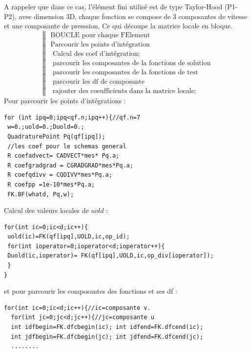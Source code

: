 \documentclass{book}
\begin{document}
A rappeler que dans ce cas, l'élément fini utilisé est de type Taylor-Hood (P1-P2), avec dimension 3D, chaque fonction se compose de 3 composantes de vitesse et une composante de presssion. Ce qui découpe la matrice locale en bloque.  
\[
\left\|
\begin{array}{l}
\text{BOUCLE pour chaque FElement} \\
\text{Parcourir les points d'intégration} \\
\text{ Calcul des coef d'intégration;} \\
\text{ parcourir les composantes de la fonctions de solution}\\
\text{   parcourir les composantes de la fonctions de test}\\
\text{      parcourir les df de composante}\\
\text{          rajouter des coeufficients dans la matrice locale;} 
\end{array}
\right.
\]
Pour parcourir les points d'intégrations :
\begin{lstlisting}
for (int ipq=0;ipq<qf.n;ipq++){//qf.n=7
 w=0.;uold=0.;Duold=0.;
 QuadraturePoint Pq(qf[ipq]);
 //les coef pour le schemas general
 R coefadvect= CADVECT*mes* Pq.a;
 R coefgradgrad = CGRADGRAD*mes*Pq.a;
 R coefqdivv = CQDIVV*mes*Pq.a;
 R coefpp =1e-10*mes*Pq.a;
 FK.BF(whatd, Pq,w); 
\end{lstlisting}
Calcul des valeurs locales de $uold$ :
\begin{lstlisting}
for(int ic=0;ic<d;ic++){ 
 uold(ic)=FK(qf[ipq],UOLD,ic,op_id);
 for(int ioperator=0;ioperator<d;ioperator++){
 Duold(ic,ioperator)= FK(qf[ipq],UOLD,ic,op_div[ioperator]);
 }	
}	  
\end{lstlisting}
et pour parcourir les composantes des fonctions et ses df :
\begin{lstlisting}
for(int ic=0;ic<d;ic++){//ic=composante v.
  for(int jc=0;jc<d;jc++){//jc=composante u
  int idfbegin=FK.dfcbegin(ic); int idfend=FK.dfcend(ic); 
  int jdfbegin=FK.dfcbegin(jc); int jdfend=FK.dfcend(jc); 
  ........
\end{lstlisting}

\end{document}
